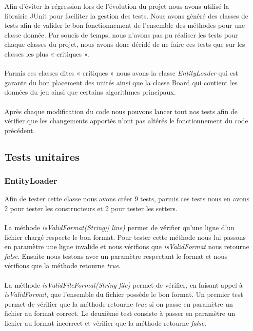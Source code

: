 		Afin d'éviter la régression lors de l'évolution du projet nous avons utilisé la librairie JUnit pour faciliter la gestion des tests. 
		Nous avons généré des classes de tests afin de valider le bon fonctionnement de l'ensemble des méthodes pour une classe donnée.
		Par soucis de temps, nous n'avons pas pu réaliser les tests pour chaque classes du projet, nous avons donc décidé de ne faire ces tests que sur les classes les plus « critiques ».\\ \\
		Parmis ces classes dites « critiques » nous avons la classe {\itshape EntityLoader} qui est garante du bon placement des unités ainsi que la classe Board qui contient les données du jeu
		ainsi que certains algorithmes principaux.
		\\ \\
		Après chaque modification du code nous pouvons lancer tout nos tests afin de vérifier que les changements apportés n'ont pas altérés le fonctionnement du code précédent.
		
		\subsection{Tests unitaires}

			\subsubsection{EntityLoader}
				
				Afin de tester cette classe nous avons créer 9 tests, parmis ces tests nous en avons 2 pour tester les constructeurs et 2 pour tester les setters.\\ \\
				La méthode {\itshape isValidFormat(String[] line)} permet de vérifier qu'une ligne d'un fichier chargé respecte le bon format.
				Pour tester cette méthode nous lui passons en paramètre une ligne invalide et nous vérifions que {\itshape isValidFormat} nous retourne {\itshape false}.
				Ensuite nous testons avec un paramètre respectant le format et nous vérifions que la méthode retourne {\itshape true}.\\ \\

				La méthode {\itshape isValidFileFormat(String file)} permet de vérifier, en faisant appel à {\itshape isValidFormat}, que l'ensemble du fichier possède le bon format.
				Un premier test permet de vérifier que la méthode retourne {\itshape true} si on passe en paramètre un fichier au format correct.
				Le deuxième test consiste à passer en paramètre un fichier au format incorrect et vérifier que la méthode retourne {\itshape false}.\\ \\

